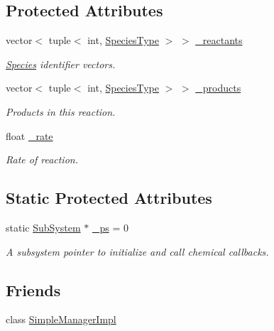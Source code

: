 \subsection*{Protected Attributes}
\begin{DoxyCompactItemize}
\item 
vector$<$ tuple$<$ int, \hyperlink{Species_8h_a50651af47c56ea0e27235468d23542cf}{Species\+Type} $>$ $>$ \hyperlink{classInternalFilamentRxnManager_a63de9061c3da4ad03cf4c530d2774979}{\+\_\+reactants}
\begin{DoxyCompactList}\small\item\em \hyperlink{classSpecies}{Species} identifier vectors. \end{DoxyCompactList}\item 
vector$<$ tuple$<$ int, \hyperlink{Species_8h_a50651af47c56ea0e27235468d23542cf}{Species\+Type} $>$ $>$ \hyperlink{classInternalFilamentRxnManager_afd213da1a3706e2e88962e5da886a5dc}{\+\_\+products}
\begin{DoxyCompactList}\small\item\em Products in this reaction. \end{DoxyCompactList}\item 
float \hyperlink{classInternalFilamentRxnManager_a8b98dd9e6f5d016149f5434b891806df}{\+\_\+rate}
\begin{DoxyCompactList}\small\item\em Rate of reaction. \end{DoxyCompactList}\end{DoxyCompactItemize}
\subsection*{Static Protected Attributes}
\begin{DoxyCompactItemize}
\item 
static \hyperlink{classSubSystem}{Sub\+System} $\ast$ \hyperlink{classInternalFilamentRxnManager_a973ce9cc2aae811e6867afa46193c5f2}{\+\_\+ps} = 0
\begin{DoxyCompactList}\small\item\em A subsystem pointer to initialize and call chemical callbacks. \end{DoxyCompactList}\end{DoxyCompactItemize}
\subsection*{Friends}
\begin{DoxyCompactItemize}
\item 
class \hyperlink{classInternalFilamentRxnManager_a65026d22c7682cf798dda845cac7573a}{Simple\+Manager\+Impl}
\end{DoxyCompactItemize}


